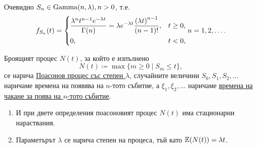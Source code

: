 \documentclass[numbers=endperiod, DIV=15, bibliography=totocnumbered]{scrartcl}
\begin{document}
\begin{definition}
\begin{enumerate}
    Очевидно $S_n \in \operatorname{Gamma}(n, \lambda), n > 0$, т.е.
    \begin{displaymath}
      f_{S_n}(t)
      =
      \begin{dcases}
        \frac {\lambda^n t^{n-1} e^{-\lambda t}} {\Gamma(n)} = \lambda e^{-\lambda t} \frac {{(\lambda t)}^{n-1}} {(n-1)!}, &t \geq 0, \\
        0, &t < 0,
      \end{dcases}
      n = 1, 2, \ldots.
    \end{displaymath}

    Броящият процес $N(t)$, за който е изпълнено
    \begin{displaymath}
      N(t) \coloneqq \max \{ m \geq 0 \mid S_m \leq t \},
    \end{displaymath}
    се нарича \uline{Поасонов процес със степен $\lambda$}, случайните величини $S_0, S_1, S_2, \ldots$ наричаме времена на появява на $n$-тото събитие, а $\xi_1, \xi_2, \ldots$ наричаме \uline{времена на чакане за поява на $n$-тото събитие}.
  \end{enumerate}
\end{definition}

\begin{note}
  \mbox{}
  \begin{enumerate}
    \item И при двете определения поасоновият процес $N(t)$ има стационарни нараствания.
    \item Параметърът $\lambda$ се нарича степен на процеса, тъй като $\mathbb{E}(N(t)) = \lambda t$.
  \end{enumerate}
\end{note}
\end{document}
